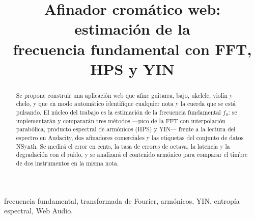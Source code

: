 \documentclass[conference,a4paper]{IEEEtran}
\newcommand{\fo}{f_0}
\begin{document}
\title{Afinador cromático web: estimación de la\\ frecuencia fundamental con FFT, HPS y YIN}

\author{
\and
{}
\and
{}
}

\maketitle

\begin{abstract}
Se propone construir una aplicación web que afine guitarra, bajo, ukelele, violín y chelo, y que en modo automático identifique cualquier nota y la cuerda que se está pulsando. El núcleo del trabajo es la estimación de la frecuencia fundamental $\fo$: se implementarán y compararán tres métodos ---pico de la FFT con interpolación parabólica, producto espectral de armónicos (HPS) y YIN--- frente a la lectura del espectro en Audacity, dos afinadores comerciales y las etiquetas del conjunto de datos NSynth. Se medirá el error en cents, la tasa de errores de octava, la latencia y la degradación con el ruido, y se analizará el contenido armónico para comparar el timbre de dos instrumentos en la misma nota.
\end{abstract}

\begin{IEEEkeywords}
frecuencia fundamental, transformada de Fourier, armónicos, YIN, entropía espectral, Web Audio.
\end{IEEEkeywords}
\end{document}
